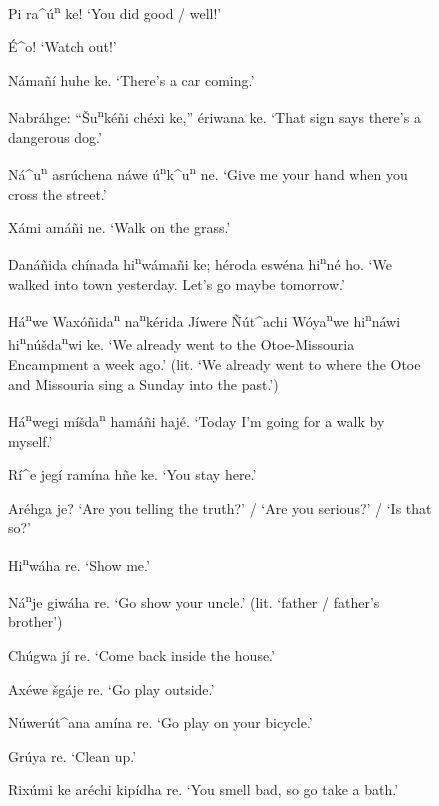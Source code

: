 \documentclass[output=paper]{LSP/langsci}
\begin{document}
\begin{figure}[p]
\begin{list}{}{} \itemsep1pt \parskip0pt 
\item{Pi ra\^{ }\'u\textsuperscript{n} ke! `You did good / well!'}
\item{\'E\^{ }o! `Watch out!'}
\item{N\'ama\~n\'i huhe ke. `There's a car coming.'}
\item{Nabr\'ahge: ``\v{S}u\textsuperscript{n}k\'e\~ni ch\'exi ke,'' \'eriwana ke. `That sign says there's a dangerous dog.'}
\item{N\'a\^{ }u\textsuperscript{n} asr\'uchena n\'awe \'u\textsuperscript{n}k\^{ }u\textsuperscript{n} ne. `Give me your hand when you cross the street.'}
\item{X\'ami am\'a\~ni ne. `Walk on the grass.'}
\item{Dan\'a\~nida ch\'inada hi\textsuperscript{n}w\'ama\~ni ke; h\'eroda esw\'ena hi\textsuperscript{n}n\'e ho. `We walked into town yesterday. Let's go maybe tomorrow.'}
\item{H\'a\textsuperscript{n}we Wax\'o\~nida\textsuperscript{n} na\textsuperscript{n}k\'erida J\'iwere \~N\'ut\^{ }achi W\'oya\textsuperscript{n}we hi\textsuperscript{n}náwi hi\textsuperscript{n}n\'u\v{s}da\textsuperscript{n}wi ke. `We already went to the Otoe-Missouria Encampment a week ago.' (lit. `We already went to where the Otoe and Missouria sing a Sunday into the past.')}
\item{H\'a\textsuperscript{n}wegi m\'i\v{s}da\textsuperscript{n} ham\'a\~ni haj\'e.  `Today I'm going for a walk by myself.'}
\item{R\'i\^{ }e jeg\'i ram\'ina h\~ne ke. `You stay here.'}
\item{Ar\'ehga je? `Are you telling the truth?' / `Are you serious?' / `Is that so?'}
\item{Hi\textsuperscript{n}w\'aha re. `Show me.'}
\item{N\'a\textsuperscript{n}je giw\'aha re. `Go show your uncle.' (lit. `father / father's brother')}
\item{Ch\'ugwa jí re.	`Come back inside the house.'}
\item{}
\item{Ax\'ewe \v{s}g\'aje re. `Go play outside.'}
\item{N\'uwer\'ut\^{ }ana am\'ina re.	`Go play on your bicycle.'}
\item{Gr\'uya re.	`Clean up.'}
\item{Rix\'umi ke ar\'echi kip\'idha re. `You smell bad, so go take a bath.'}

\end{list}
\end{figure}
\end{document}
